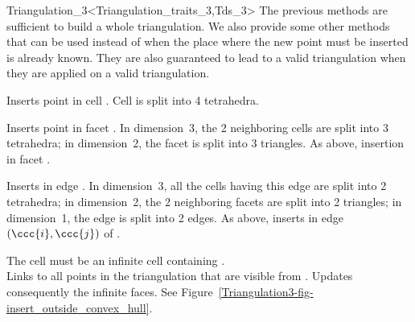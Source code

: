 \begin{ccRefClass}{Triangulation_3<Triangulation_traits_3,Tds_3>}
The previous methods are sufficient to build a whole triangulation. We
also provide some other methods that can be used instead of
 when the place where the new point  must be inserted
is already known. They are also guaranteed to lead to a valid
triangulation when they are applied on a valid triangulation.

{Inserts point  in cell . Cell  is split into 4
tetrahedra.
} 

{Inserts point  in facet . In dimension~3, the 2
neighboring cells are split into 3 tetrahedra; in dimension~2, the facet 
is split into 3 triangles.
}
\ccGlue
{}
{As above, insertion in facet .
}

{Inserts  in edge . In dimension~3, 
all the cells having this edge are split into 2 tetrahedra; in
dimension~2, the 2 neighboring facets are split into 2 triangles; in
dimension~1, the edge is split into 2 edges.
}
\ccGlue
{} 
{As above, inserts  in edge $(\ccc{i}, \ccc{j})$ of .
} 

{%
The cell  must be an infinite cell containing .\\
Links  to all  points in the triangulation that are visible from
. Updates consequently the infinite faces. See
Figure~\ref{Triangulation3-fig-insert_outside_convex_hull}.
}


\end{ccRefClass}
